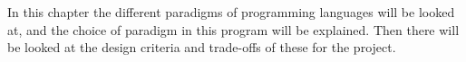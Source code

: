 In this chapter the different paradigms of programming languages will be looked at, and the choice of paradigm in this program will be explained. Then there will be looked at the design criteria and trade-offs of these for the project.